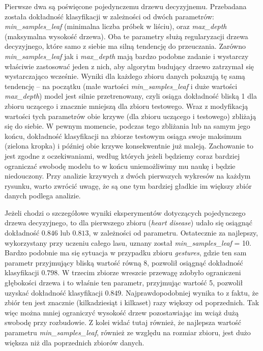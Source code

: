 \documentclass{classrep}
\begin{document}
{{            Pierwsze dwa są poświęcone pojedynczemu drzewu decyzyjnemu. Przebadana
            została dokładność klasyfikacji w zależności od dwóch parametrów:
            \emph{min\_samples\_leaf} (minimalna liczba próbek w liściu), oraz
            \emph{max\_depth} (maksymalna wysokość drzewa). Oba te parametry służą
            regularyzacji drzewa decyzyjnego, które samo z siebie ma silną tendencję do
            przeuczania. Zarówno \emph{min\_samples\_leaf} jak i \emph{max\_depth} mają
            bardzo podobne zadanie i wystarczy właściwie zastosować jeden z nich, aby
            algorytm budujący drzewo zatrzymał się wystarczająco wcześnie. Wyniki dla
            każdego zbioru danych pokazują tę samą tendencję -- na początku (małe
            wartości \emph{min\_samples\_leaf} i duże wartości \emph{max\_depth}) model
            jest silnie przetrenowany, czyli osiąga dokładność bliską 1 dla zbioru
            uczącego i znacznie mniejszą dla zbioru testowego. Wraz z modyfikacją
            wartości tych parametrów obie krzywe (dla zbioru uczącego i testowego)
            zbliżają się do siebie. W pewnym momencie, podczas tego zbliżania lub na
            samym jego końcu, dokładność klasyfikacji na zbiorze testowym osiąga swoje
            maksimum (zielona kropka) i później obie krzywe konsekwentnie już maleją.
            Zachowanie to jest zgodne z oczekiwaniami, według których jeżeli będziemy
            coraz bardziej ograniczać swobodę modelu to w końcu uniemożliwimy mu naukę
            i będzie niedouczony. Przy analizie krzywych z dwóch pierwszych wykresów na
            każdym rysunku, warto zwrócić uwagę, że są one tym bardziej gładkie im
            większy zbiór danych podlega analizie.

            Jeżeli chodzi o szczegółowe wyniki eksperymentów dotyczących pojedynczego
            drzewa decyzyjnego, to dla pierwszego zbioru (\emph{heart disease}) udało
            się osiągnąć dokładność $0.846$ lub $0.813$, w zależności od parametru.
            Ostatecznie za najlepszy, wykorzystany przy uczeniu całego lasu, uznany
            został \emph{min\_samples\_leaf} = 10. Bardzo podobnie ma się sytuacja w
            przypadku zbioru \emph{gestures}, gdzie ten sam parametr przyjmujący bliską
            wartość równą 8, pozwolił osiągnąć dokładność klasyfikacji $0.798$. W
            trzecim zbiorze wreszcie przewagę zdobyło ograniczeni głębokości drzewa i
            to właśnie ten parametr, przyjmując wartość 5, pozwolił uzyskać dokładność
            klasyfikacji $0.849$. Najprawdopodobniej wynika to z faktu, że zbiór ten
            jest znacznie (kilkadziesiąt i kilkaset) razy większy od poprzednich. Tak
            więc można mniej ograniczyć wysokość drzew pozostawiając im wciąż dużą
            swobodę przy rozbudowie. Z kolei widać tutaj również, że najlepsza wartość
            parametru \emph{min\_samples\_leaf}, również ze względu na rozmiar zbioru,
            jest dużo większa niż dla poprzednich zbiorów danych.

}}
\end{document}
